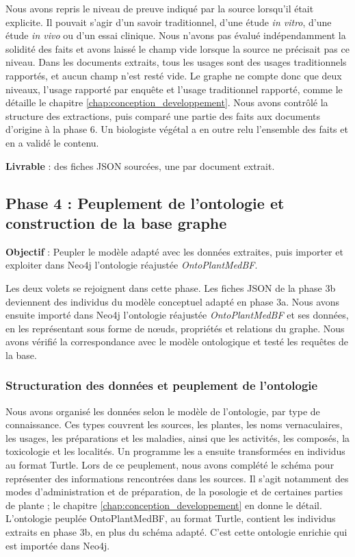 Nous avons repris le niveau de preuve indiqué par la source lorsqu'il était explicite. Il pouvait s'agir d'un savoir traditionnel, d'une étude \textit{in vitro}, d'une étude \textit{in vivo} ou d'un essai clinique. Nous n'avons pas évalué indépendamment la solidité des faits et avons laissé le champ vide lorsque la source ne précisait pas ce niveau. Dans les documents extraits, tous les usages sont des usages traditionnels rapportés, et aucun champ n'est resté vide. Le graphe ne compte donc que deux niveaux, l'usage rapporté par enquête et l'usage traditionnel rapporté, comme le détaille le chapitre \ref{chap:conception_developpement}. Nous avons contrôlé la structure des extractions, puis comparé une partie des faits aux documents d'origine à la phase 6. Un biologiste végétal a en outre relu l'ensemble des faits et en a validé le contenu.

\textbf{Livrable} : des fiches JSON sourcées, une par document extrait.


\subsection{Phase 4 : Peuplement de l'ontologie et construction de la base graphe}
\label{subsec:phase4}

\textbf{Objectif} : Peupler le modèle adapté avec les données extraites, puis importer et exploiter dans Neo4j l'ontologie réajustée \textit{OntoPlantMedBF}.

Les deux volets se rejoignent dans cette phase. Les fiches JSON de la phase 3b deviennent des individus du modèle conceptuel adapté en phase 3a. Nous avons ensuite importé dans Neo4j l'ontologie réajustée \textit{OntoPlantMedBF} et ses données, en les représentant sous forme de nœuds, propriétés et relations du graphe. Nous avons vérifié la correspondance avec le modèle ontologique et testé les requêtes de la base.

\subsubsection{Structuration des données et peuplement de l'ontologie}

Nous avons organisé les données selon le modèle de l'ontologie, par type de connaissance. Ces types couvrent les sources, les plantes, les noms vernaculaires, les usages, les préparations et les maladies, ainsi que les activités, les composés, la toxicologie et les localités. Un programme les a ensuite transformées en individus au format Turtle. Lors de ce peuplement, nous avons complété le schéma pour représenter des informations rencontrées dans les sources. Il s'agit notamment des modes d'administration et de préparation, de la posologie et de certaines parties de plante ; le chapitre \ref{chap:conception_developpement} en donne le détail. L'ontologie peuplée OntoPlantMedBF, au format Turtle, contient les individus extraits en phase 3b, en plus du schéma adapté. C'est cette ontologie enrichie qui est importée dans Neo4j.


